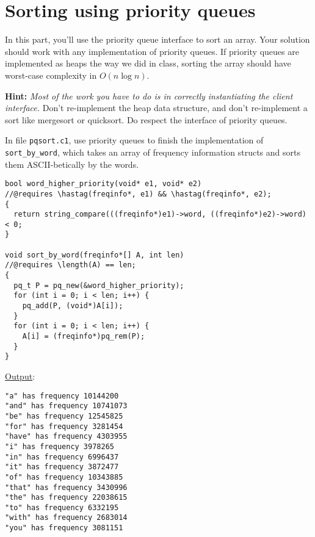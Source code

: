 \section*{Sorting using priority queues}

In this part, you'll use the priority queue interface to sort an
array.  Your solution should work with any implementation of priority
queues. If priority queues are implemented as heaps the way we did in
class, sorting the array should have worst-case complexity in $O(n
\log n)$.

\textbf{Hint:} \emph{Most of the work you have to do is in correctly
  instantiating the client interface.} Don't re-implement the heap
data structure, and don't re-implement a sort like mergesort or
quicksort. Do respect the interface of priority queues.

\begin{part}
  In file \lstinline'pqsort.c1', use priority queues to finish the
  implementation of \lstinline'sort_by_word', which takes an array of
  frequency information structs and sorts them ASCII-betically by
  the words.

  \begin{solution}
    \begin{lstlisting}
bool word_higher_priority(void* e1, void* e2)
//@requires \hastag(freqinfo*, e1) && \hastag(freqinfo*, e2);
{
  return string_compare(((freqinfo*)e1)->word, ((freqinfo*)e2)->word) < 0;
}

void sort_by_word(freqinfo*[] A, int len)
//@requires \length(A) == len;
{
  pq_t P = pq_new(&word_higher_priority);
  for (int i = 0; i < len; i++) {
    pq_add(P, (void*)A[i]);
  }
  for (int i = 0; i < len; i++) {
    A[i] = (freqinfo*)pq_rem(P);
  }
}
    \end{lstlisting}
    \underline{Output}:
    \begin{lstlisting}
"a" has frequency 10144200
"and" has frequency 10741073
"be" has frequency 12545825
"for" has frequency 3281454
"have" has frequency 4303955
"i" has frequency 3978265
"in" has frequency 6996437
"it" has frequency 3872477
"of" has frequency 10343885
"that" has frequency 3430996
"the" has frequency 22038615
"to" has frequency 6332195
"with" has frequency 2683014
"you" has frequency 3081151
    \end{lstlisting}
  \end{solution}
\end{part}

